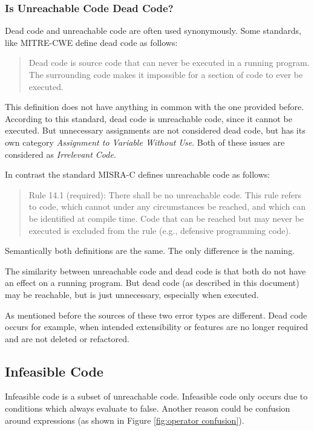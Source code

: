\subsubsection{Is Unreachable Code Dead Code?}
Dead code and unreachable code are often used synonymously. 
Some standards, like MITRE-CWE \cite{CWECWE561Dead} define dead code as follows:
\begin{quote}
	Dead code is source code that can never be executed in a running program. The surrounding code makes it impossible for a section of code to ever be executed.
\end{quote}
This definition does not have anything in common with the one provided before. According to this standard, dead code is unreachable code, since it cannot be executed. But unnecessary assignments are not considered dead code, but has its own category \emph{Assignment to Variable Without Use}.
Both of these issues are considered as \emph{Irrelevant Code}.

\pagebreak
In contrast the standard MISRA-C \cite{motorindustrysoftwarereliabilityassociationMISRAC2004Guidelines2008} defines unreachable code as follows:
\begin{quote}
	Rule 14.1 (required): There shall be no unreachable code.
	This  rule  refers  to  code,  which  cannot  under  any  circumstances  be  reached,  and  which  can  be 
	identified at compile time. Code that can be reached but may never be executed is excluded 
	from the rule (e.g., defensive programming code).	
\end{quote}
Semantically both definitions are the same. The only difference is the naming.


The similarity between unreachable code and dead code is that both do not have an effect on a running program. But dead code (as described in this document) may be reachable, but is just unnecessary, especially when executed. 


As mentioned before the sources of these two error types are different.
Dead code occurs for example, when intended extensibility or features are no longer required and are not deleted or refactored.
\subsection{Infeasible Code}
\label{sub:infeasible code}
Infeasible code is a subset of unreachable code.
Infeasible code only occurs due to conditions which always evaluate to false. Another reason could be confusion around expressions \cite{Eichberg_2015} (as shown in Figure \ref{fig:operator confusion}).


